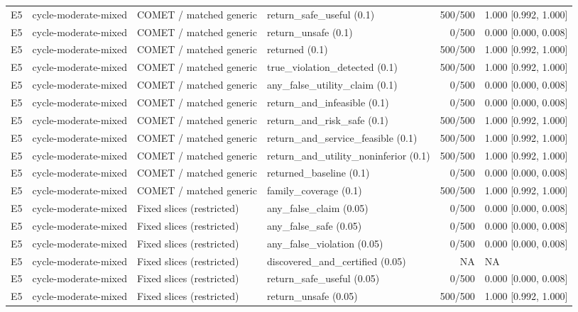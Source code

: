\begin{longtable}{p{.04\linewidth}p{.18\linewidth}p{.19\linewidth}p{.16\linewidth}r p{.21\linewidth}}
E5 & cycle-moderate-mixed & COMET / matched generic & return\_safe\_useful (0.1) & 500/500 & 1.000 [0.992, 1.000]\\
E5 & cycle-moderate-mixed & COMET / matched generic & return\_unsafe (0.1) & 0/500 & 0.000 [0.000, 0.008]\\
E5 & cycle-moderate-mixed & COMET / matched generic & returned (0.1) & 500/500 & 1.000 [0.992, 1.000]\\
E5 & cycle-moderate-mixed & COMET / matched generic & true\_violation\_detected (0.1) & 500/500 & 1.000 [0.992, 1.000]\\
E5 & cycle-moderate-mixed & COMET / matched generic & any\_false\_utility\_claim (0.1) & 0/500 & 0.000 [0.000, 0.008]\\
E5 & cycle-moderate-mixed & COMET / matched generic & return\_and\_infeasible (0.1) & 0/500 & 0.000 [0.000, 0.008]\\
E5 & cycle-moderate-mixed & COMET / matched generic & return\_and\_risk\_safe (0.1) & 500/500 & 1.000 [0.992, 1.000]\\
E5 & cycle-moderate-mixed & COMET / matched generic & return\_and\_service\_feasible (0.1) & 500/500 & 1.000 [0.992, 1.000]\\
E5 & cycle-moderate-mixed & COMET / matched generic & return\_and\_utility\_noninferior (0.1) & 500/500 & 1.000 [0.992, 1.000]\\
E5 & cycle-moderate-mixed & COMET / matched generic & returned\_baseline (0.1) & 0/500 & 0.000 [0.000, 0.008]\\
E5 & cycle-moderate-mixed & COMET / matched generic & family\_coverage (0.1) & 500/500 & 1.000 [0.992, 1.000]\\
E5 & cycle-moderate-mixed & Fixed slices (restricted) & any\_false\_claim (0.05) & 0/500 & 0.000 [0.000, 0.008]\\
E5 & cycle-moderate-mixed & Fixed slices (restricted) & any\_false\_safe (0.05) & 0/500 & 0.000 [0.000, 0.008]\\
E5 & cycle-moderate-mixed & Fixed slices (restricted) & any\_false\_violation (0.05) & 0/500 & 0.000 [0.000, 0.008]\\
E5 & cycle-moderate-mixed & Fixed slices (restricted) & discovered\_and\_certified (0.05) & NA & NA\\
E5 & cycle-moderate-mixed & Fixed slices (restricted) & return\_safe\_useful (0.05) & 0/500 & 0.000 [0.000, 0.008]\\
E5 & cycle-moderate-mixed & Fixed slices (restricted) & return\_unsafe (0.05) & 500/500 & 1.000 [0.992, 1.000]\\

\end{longtable}
